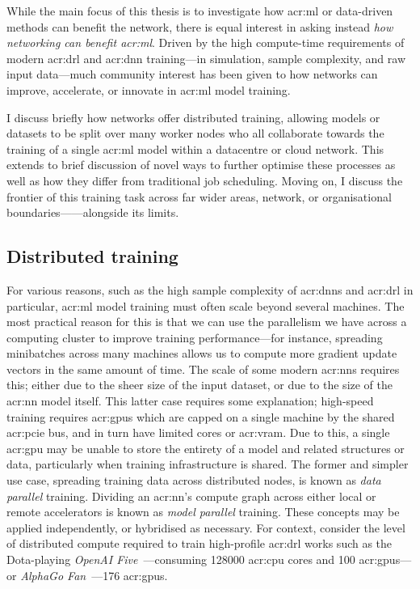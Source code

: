 While the main focus of this thesis is to investigate how \gls{acr:ml} or data-driven methods can benefit the network, there is equal interest in asking instead \emph{how networking can benefit \gls{acr:ml}}.
Driven by the high compute-time requirements of modern \gls{acr:drl} and \gls{acr:dnn} training---in simulation, sample complexity, and raw input data---much community interest has been given to how networks can improve, accelerate, or innovate in \gls{acr:ml} model training.

I discuss briefly how networks offer distributed training, allowing models or datasets to be split over many worker nodes who all collaborate towards the training of a single \gls{acr:ml} model within a datacentre or cloud network.
This extends to brief discussion of novel ways to further optimise these processes as well as how they differ from traditional job scheduling.
Moving on, I discuss the frontier of this training task across far wider areas, network, or organisational boundaries------alongside its limits.


\subsection{Distributed training}\label{sec:distributed-training}
For various reasons, such as the high sample complexity of \glspl{acr:dnn} and \gls{acr:drl} in particular, \gls{acr:ml} model training must often scale beyond several machines.
The most practical reason for this is that we can use the parallelism we have across a computing cluster to improve training performance---for instance, spreading minibatches across many machines allows us to compute more gradient update vectors in the same amount of time.
The scale of some modern \glspl{acr:nn} requires this; either due to the sheer size of the input dataset, or due to the size of the \gls{acr:nn} model itself.
This latter case requires some explanation; high-speed training requires \glspl{acr:gpu} which are capped on a single machine by the shared \gls{acr:pcie} bus, and in turn have limited cores or \gls{acr:vram}.
Due to this, a single \gls{acr:gpu} may be unable to store the entirety of a model and related structures or data, particularly when training infrastructure is shared.
The former and simpler use case, spreading training data across distributed nodes, is known as \emph{data parallel} training.
Dividing an \gls{acr:nn}'s compute graph across either local or remote accelerators is known as \emph{model parallel} training.
These concepts may be applied independently, or hybridised as necessary.
For context, consider the level of distributed compute required to train high-profile \gls{acr:drl} works such as the Dota-playing \emph{OpenAI Five}~\parencite{openai-five}---consuming \num{128000} \gls{acr:cpu} cores and \num{100} \glspl{acr:gpu}---or \emph{AlphaGo Fan}~\parencite{DBLP:journals/nature/SilverSSAHGHBLB17}---\num{176} \glspl{acr:gpu}. 	

